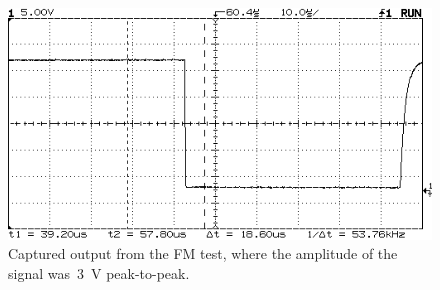 %
\begin{figure}[H]
	\centering
	\includegraphics[width=.6\textwidth]{img/shot/shot9.png}
	\parbox{.6\textwidth}{
	\caption[Frequency Modulation --- \SI{3}{\volt} peak-to-peak]{Captured
	output from the FM test, where the amplitude of the signal
	was~\SI{3}{\volt} peak-to-peak.}
	\label{fig:shot9}}
\end{figure}
